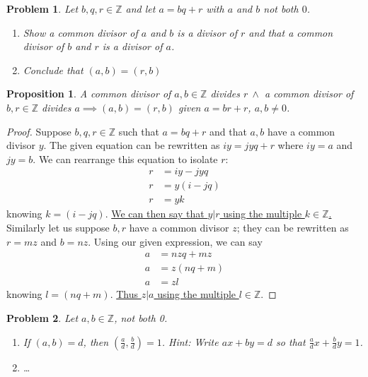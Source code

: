 \documentclass[12pt]{article}
\newtheorem*{prop}{Proposition}
\newtheorem{problem}{Problem}
\theoremstyle{remark}  %
\begin{document}
\setcounter{problem}{16}
    \begin{problem}
        Let $b,q,r\in \mathbb{Z}$ and let $a=bq+r$ with $a$ and $b$ not both $0$.
        \begin{enumerate}[label=(\alph*)]
            \item Show a common divisor of $a$ and $b$ is a divisor of $r$ and that a common divisor of $b$ and $r$ is a divisor of $a$.
            \item Conclude that $(a,b)=(r,b)$
        \end{enumerate}
    \end{problem}
    \begin{prop}
        A common divisor of $a,b\in\mathbb{Z}$ divides $r\ \land$ a common divisor of $b,r\in\mathbb{Z}$ divides $a\implies(a,b)=(r,b)$ given $a=br+r$, $a,b\neq0$.
    \end{prop}
    \begin{proof}
        Suppose $b,q,r\in\mathbb{Z}$ such that $a=bq+r$ and that $a,b$ have a common divisor $y$. The given equation can be rewritten as $iy=jyq+r$ where $iy=a$ and $jy=b$. We can rearrange this equation to isolate $r$: \begin{align*}
            r &= iy-jyq \\
            r &= y(i-jq) \\
            r &= yk
        \end{align*}
        knowing $k=(i-jq)$. \underline{We can then say that $y|r$ using the multiple $k\in\mathbb{Z}$.} Similarly let us suppose $b,r$ have a common divisor $z$; they can be rewritten as $r=mz$ and $b=nz$. Using our given expression, we can say
        \begin{align*}
            a &= nzq + mz \\
            a &= z(nq+m) \\
            a &= zl
        \end{align*}
        knowing $l=(nq+m)$. \underline{Thus $z|a$ using the multiple $l\in\mathbb{Z}$}.
    \end{proof}
\vspace{.5em}

\setcounter{problem}{18}
    \begin{problem}
        Let $a,b\in\mathbb{Z}$, not both 0.
        \begin{enumerate}[label=(\alph*)]
            \item If $(a,b)=d$, then $\left(\frac{a}{d},\frac{b}{d}\right)=1$. Hint: Write $ax+by=d$ so that $\frac{a}{d}x+\frac{b}{d}y=1$.
            \item \dots
        \end{enumerate}
    \end{problem}
\end{document}
